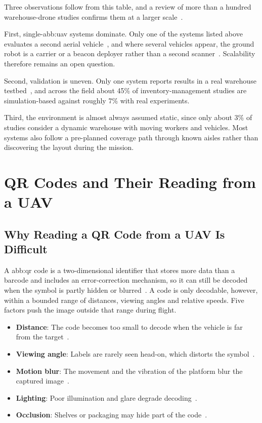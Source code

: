 \FloatBarrier

Three observations follow from this table, and a review of more than a hundred
warehouse-drone studies confirms them at a larger scale~\cite{pore2026drone}.

First, single-\gls{abb:uav} systems dominate. Only one of the systems listed
above evaluates a second aerial vehicle~\cite{pore2026uavqr}, and where several
vehicles appear, the ground robot is a carrier or a beacon deployer rather than a
second scanner~\cite{kalinov2020warevision, guinand2021uavugv}. Scalability
therefore remains an open question.

Second, validation is uneven. Only one system reports results in a real warehouse
testbed~\cite{pore2026uavqr}, and across the field about 45\% of
inventory-management studies are simulation-based against roughly 7\% with real
experiments.

Third, the environment is almost always assumed static, since only about 3\% of
studies consider a dynamic warehouse with moving workers and vehicles. Most
systems also follow a pre-planned coverage path through known aisles rather than
discovering the layout during the mission.
\section{QR Codes and Their Reading from a UAV}%
\label{sec:bg:qr}

\subsection{Why Reading a QR Code from a UAV Is Difficult}%
\label{subsec:bg:qr-codes}

A \gls{abb:qr} code is a two-dimensional identifier that stores more data than a
barcode and includes an error-correction mechanism, so it can still be decoded
when the symbol is partly hidden or blurred~\cite{dong2024motionblurred}. A code
is only decodable, however, within a bounded range of distances, viewing angles
and relative speeds. Five factors push the image outside that range during
flight.

\begin{itemize}[itemsep=0.5em]
    \item \textbf{Distance}: The code becomes too small to decode when the
          vehicle is far from the target~\cite{kalinov2020warevision}.
    \item \textbf{Viewing angle}: Labels are rarely seen head-on, which distorts
          the symbol~\cite{alsulami2026deep}.
    \item \textbf{Motion blur}: The movement and the vibration of the platform
          blur the captured image~\cite{dong2024motionblurred}.
    \item \textbf{Lighting}: Poor illumination and glare degrade
          decoding~\cite{pore2026drone}.
    \item \textbf{Occlusion}: Shelves or packaging may hide part of the
          code~\cite{alsulami2026deep}.
\end{itemize}


